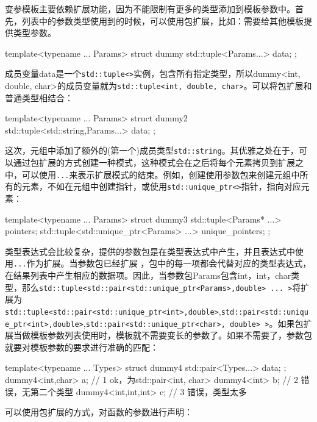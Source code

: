 
变参模板主要依赖扩展功能，因为不能限制有更多的类型添加到模板参数中。首先，列表中的参数类型使用到的时候，可以使用包扩展，比如：需要给其他模板提供类型参数。

\begin{cpp}
template<typename ... Params>
struct dummy
{
  std::tuple<Params...> data;
};
\end{cpp}

成员变量data是一个\texttt{std::tuple<>}实例，包含所有指定类型，所以dummy<int, double, char>的成员变量就为\texttt{std::tuple<int, double, char>}。可以将包扩展和普通类型相结合：

\begin{cpp}
template<typename ... Params>
struct dummy2
{
  std::tuple<std::string,Params...> data;
};
\end{cpp}

这次，元组中添加了额外的(第一个)成员类型\texttt{std::string}。其优雅之处在于，可以通过包扩展的方式创建一种模式，这种模式会在之后将每个元素拷贝到扩展之中，可以使用\texttt{...}来表示扩展模式的结束。例如，创建使用参数包来创建元组中所有的元素，不如在元组中创建指针，或使用\texttt{std::unique\_ptr<>}指针，指向对应元素：

\begin{cpp}
template<typename ... Params>
struct dummy3
{
  std::tuple<Params* ...> pointers;
  std::tuple<std::unique_ptr<Params> ...> unique_pointers;
};
\end{cpp}

类型表达式会比较复杂，提供的参数包是在类型表达式中产生，并且表达式中使用\texttt{...}作为扩展。当参数包已经扩展 ，包中的每一项都会代替对应的类型表达式，在结果列表中产生相应的数据项。因此，当参数包Params包含int，int，char类型，那么\texttt{std::tuple<std::pair<std::unique\_ptr<Params>,double> ... >}将扩展为\texttt{std::tuple<std::pair<std::unique\_ptr<int>,double>},\texttt{std::pair<std::unique\_ptr<int>,double>},\texttt{std::pair<std::unique\_ptr<char>, double> >}。如果包扩展当做模板参数列表使用时，模板就不需要变长的参数了。如果不需要了，参数包就要对模板参数的要求进行准确的匹配：

\begin{cpp}
template<typename ... Types>
struct dummy4
{
  std::pair<Types...> data;
};
dummy4<int,char> a;  // 1 ok，为std::pair<int, char>
dummy4<int> b;  // 2 错误，无第二个类型
dummy4<int,int,int> c;  // 3 错误，类型太多
\end{cpp}

可以使用包扩展的方式，对函数的参数进行声明：

